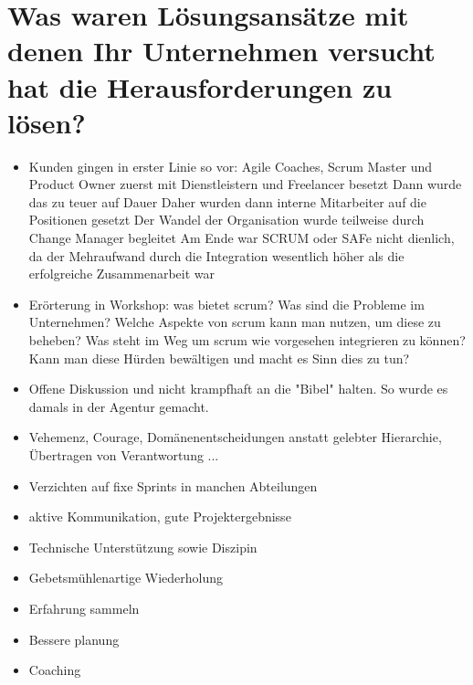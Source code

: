 \section*{Was waren Lösungsansätze mit denen Ihr Unternehmen versucht hat die Herausforderungen zu lösen?}
\begin{itemize}
    \item[\openresponse] Kunden gingen in erster Linie so vor: Agile Coaches, Scrum Master und Product Owner zuerst mit Dienstleistern und Freelancer besetzt Dann wurde das zu teuer auf Dauer Daher wurden dann interne Mitarbeiter auf die Positionen gesetzt Der Wandel der Organisation wurde teilweise durch Change Manager begleitet Am Ende war SCRUM oder SAFe nicht dienlich, da der Mehraufwand durch die Integration wesentlich höher als die erfolgreiche Zusammenarbeit war
    \item[\openresponse] Erörterung in Workshop: was bietet scrum? Was sind die Probleme im Unternehmen? Welche Aspekte von scrum kann man nutzen, um diese zu beheben? Was steht im Weg um scrum wie vorgesehen integrieren zu können? Kann man diese Hürden bewältigen und macht es Sinn dies zu tun?
    \item[\openresponse] Offene Diskussion und nicht krampfhaft an die "Bibel" halten. So wurde es damals in der Agentur gemacht.
    \item[\openresponse] Vehemenz, Courage, Domänenentscheidungen anstatt gelebter Hierarchie, Übertragen von Verantwortung ...
    \item[\openresponse] Verzichten auf fixe Sprints in manchen Abteilungen
    \item[\openresponse] aktive Kommunikation, gute Projektergebnisse
    \item[\openresponse] Technische Unterstützung sowie Diszipin
    \item[\openresponse] Gebetsmühlenartige Wiederholung
    \item[\openresponse] Erfahrung sammeln
    \item[\openresponse] Bessere planung
    \item[\openresponse] Coaching
\end{itemize}

